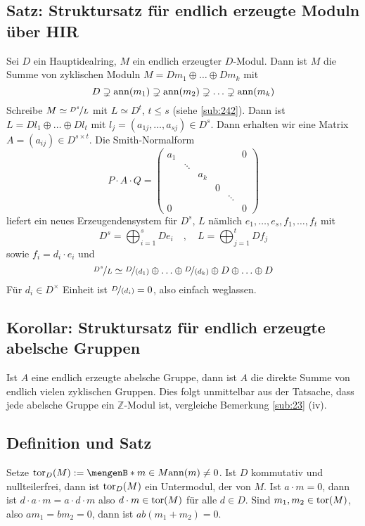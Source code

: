 \subsection{Satz: Struktursatz für endlich erzeugte Moduln über HIR} %
\label{sub:248}
Sei $D$ ein Hauptidealring, $M$ ein endlich erzeugter $D$-Modul. Dann ist $M$ die Summe von zyklischen Moduln $M= D {m_1} \oplus \ldots \oplus D {m_k}$ mit 
\[
	D \supsetneq \operatorname{ann}(m_1) \supsetneq \operatorname{ann}(m_2) \supsetneq \ldots \supsetneq \operatorname{ann}(m_k)
\]
Schreibe $M \simeq \nicefrac{D^s}{L}$ mit $L \simeq D^t$, $t \le s$ (siehe \ref{sub:242}). Dann ist $L= Dl_1 \oplus \ldots \oplus D l_t$ mit 
$l_j = (a_{1j}, \ldots , a_{sj}) \in D^s$. Dann erhalten wir eine Matrix $A= (a_{ij}) \in D^{s \times t}$. Die Smith-Normalform
\[
	P \cdot A \cdot Q = \begin{pmatrix}
		a_1 & & & & & 0 \\
		& \ddots & & & & \\
		& & a_k & & & \\
		& & & 0 & & \\
		& & && \ddots & \\
		0 & & & & & 0
	\end{pmatrix}
\]
liefert ein neues Erzeugendensystem für $D^s$, $L$ nämlich $e_1, \ldots , e_s, f_1, \ldots , f_t$ mit 
\[
	D^s = \bigoplus_{i=1}^s D{e_i} \quad , \quad L= \bigoplus_{j=1}^t D f_j
\]
sowie $f_i = d_i \cdot e_i$ und 
\[
	\nicefrac{D^s}{L} \simeq \nicefrac{D}{(d_1)} \oplus \ldots \oplus \nicefrac{D}{(d_k)} \oplus D \oplus \ldots \oplus D
\]
Für $d_i \in D^\times$ Einheit ist $\nicefrac{D}{(d_i)} = 0$, also einfach weglassen.\bewende

\subsection{Korollar: Struktursatz für endlich erzeugte abelsche Gruppen} %
\label{sub:249}
Ist $A$ eine endlich erzeugte abelsche Gruppe, dann ist $A$ die direkte Summe von endlich vielen zyklischen Gruppen.
Dies folgt unmittelbar aus der Tatsache, dass jede abelsche Gruppe ein $\mathds{Z}$-Modul ist, vergleiche Bemerkung \ref{sub:23} (iv). \bewende

\subsection[Definition und Satz: Torsionsmodul]{Definition und Satz} %
\label{sub:250}
Setze $\tor_D(M) := \set[m \in M]{\ann(m)\not= 0}$. Ist $D$ kommutativ und nullteilerfrei, dann ist $\operatorname{tor}_D(M)$ ein Untermodul, der  von $M$.
Ist $a \cdot m = 0$, dann ist $d \cdot a \cdot m= a \cdot d \cdot m$ also $d \cdot m \in \operatorname{tor}(M)$ für alle $d \in D$. Sind $m_1, m_2 \in \operatorname{tor}(M)$, also
$a m_1 = b m_2 = 0$, dann ist $a b( m_1 + m_2)=0$. \bewende

